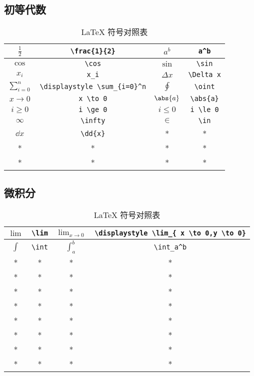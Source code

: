 

\begin{issues}
\issueDraft
\end{issues}

\subsection{初等代数}
\begin{table}[ht]
\centering
\caption{LaTeX 符号对照表}\label{tab_TeXSym0}
\begin{tabular}{|c|c|c|c|}
\hline
$\frac{1}{2}$ & \verb|\frac{1}{2}| & $a^b$ & \verb|a^b| \\
\hline
$\cos$ & \verb|\cos| & $\sin$ & \verb|\sin| \\
\hline
$x_i$ & \verb|x_i| & $\Delta x$& \verb|\Delta x| \\
\hline
$\displaystyle \sum_{i=0}^n$ & \verb|\displaystyle \sum_{i=0}^n| & $\oint$ & \verb|\oint| \\
\hline
$x \to 0$ & \verb|x \to 0| & $\abs{a}$ & \verb|\abs{a}| \\
\hline
$i \ge 0$& \verb|i \ge 0| & $i \le 0$ & \verb|i \le 0| \\
\hline
$\infty$ & \verb|\infty| & $\in$ & \verb|\in| \\
\hline
$\dd{x}$ & \verb|\dd{x}| & * & * \\
\hline
* & * & * & * \\
\hline
* & * & * & * \\
\hline
\end{tabular}
\end{table}


\subsection{微积分}
\begin{table}[ht]
\centering
\caption{LaTeX 符号对照表}\label{tab_TeXSym1}
\begin{tabular}{|c|c|c|c|}
\hline
$\lim$ & \verb|\lim| & $\displaystyle \lim_{x \to 0}$ & \verb|\displaystyle \lim_{ x \to 0,y \to 0}| \\
\hline
$\int$ & \verb|\int| & $\int_a^b$ & \verb|\int_a^b| \\
\hline
* & * & * & * \\
\hline
* & * & * & * \\
\hline
* & * & * & * \\
\hline
* & * & * & * \\
\hline
* & * & * & * \\
\hline
* & * & * & * \\
\hline
* & * & * & * \\
\hline
* & * & * & * \\
\hline
\end{tabular}
\end{table}
